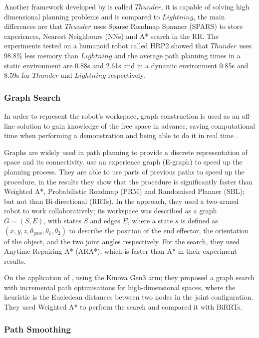 \documentclass[thesis]{mas_proposal}
\begin{document}
		Another framework developed by \cite{Coleman2015} is called $Thunder$, it is capable of solving high dimensional planning problems and is compared to $Lightning$, the main differences are that $Thunder$ uses Sparse Roadmap Spanner (SPARS) to store experiences, Nearest Neighbours (NNs) and A* search in the RR. The experiments tested on a humanoid robot called HRP2 showed that $Thunder$ uses 98.8\% less memory than $Lightning$ and the average path planning times in a static environment are 0.88s and 2.61s and in a dynamic environment 0.85s and 8.59s for $Thunder$ and $Lightning$ respectively.
		
	\subsubsection{Graph Search}
		
		In order to represent the robot's workspace, graph construction is used as an off-line solution to gain knowledge of the free space in advance, saving computational time when performing a demonstration and being able to do it in real time \cite{Siegwart2011}. 
		
		Graphs are widely used in path planning to provide a discrete representation of space and its connectivity. \cite{Phillips2012} use an experience graph (E-graph) to speed up the planning process. They are able to use parts of previous paths to speed up the procedure, in the results they show that the procedure is significantly faster than Weighted A*, Probabilistic Roadmap (PRM) and Randomised Planner (SBL); but not than Bi-directional (RRTs). In the \cite{Cohen2012} approach, they used a two-armed robot to work collaboratively; its workspace was described as a graph $G = (S, E)$, with states $S$ and edges $E$, where a state $s$ is defined as $(x, y, z, \theta_{yaw}, \theta_{1}, \theta_{2})$ to describe the position of the end effector, the orientation of the object, and the two joint angles respectively. For the search, they used Anytime Repairing A* (ARA*), which is faster than A* in their experiment results.
		
		On the application of \cite{Natarajan2023}, using the Kinova Gen3 arm; they proposed a graph search with incremental path optimisations for high-dimensional spaces, where the heuristic is the Eucledean distances between two nodes in the joint configuration. They used Weighted A* to perform the search and compared it with BiRRTs.
		
	\subsubsection{Path Smoothing}
	
\end{document}
